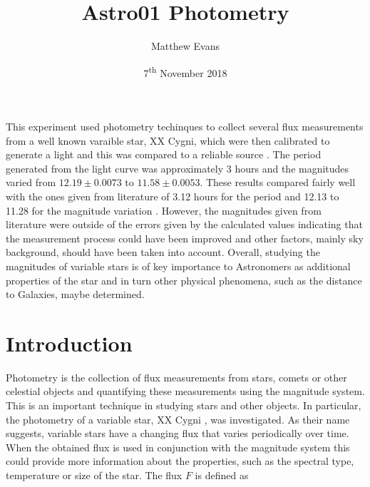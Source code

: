 \documentclass{article}
\begin{document}
\title{Astro01 Photometry} %
\author{Matthew Evans}%
\date{7\textsuperscript{th} November 2018} %
\maketitle %
\begin{onecolabstract}
\noindent
This experiment used photometry techinques to collect several flux measurements from a well known varaible star, XX Cygni, which were then calibrated to generate a light and this was compared to a reliable source \cite{Web04}. The period generated from the light curve was approximately 3 hours and the magnitudes varied from $12.19 \pm{0.0073}$ to $11.58 \pm{0.0053}$. These results compared fairly well with the ones given from literature of 3.12 hours for the period and 12.13 to 11.28 for the magnitude variation \cite{Web04}. However, the magnitudes given from literature were outside of the errors given by the calculated values indicating that the measurement process could have been improved and other factors, mainly sky background, should have been taken into account. Overall, studying the magnitudes of variable stars is of key importance to Astronomers as additional properties of the star and in turn other physical phenomena, such as the distance to Galaxies, maybe determined.

\end{onecolabstract}
\vspace{5mm} %


\section{Introduction}
\label{sec:introduction}

Photometry is the collection of flux measurements from stars, comets or other celestial objects and quantifying these measurements using the magnitude system. This is an important technique in studying stars and other objects. In particular, the photometry of a variable star, XX Cygni \cite{Paper02}, was investigated. As their name suggests, variable stars have a changing flux that varies periodically over time. When the obtained flux is used in conjunction with the magnitude system this could provide more information about the properties, such as the spectral type, temperature or size of the star. The flux $F$ is defined as
\end{document}
